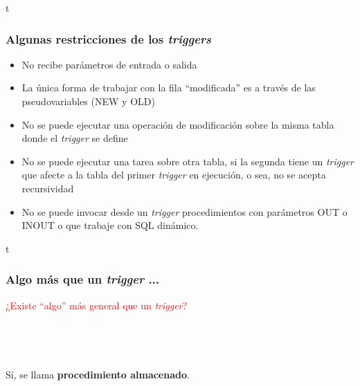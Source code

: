\documentclass[
	10pt, %
	aspectratio=169, %
]{beamer}
\begin{document}
\begin{frame}{t}
	
	\frametitle{Algunas restricciones de los \emph{triggers}}
	
	\begin{itemize}
		
		\item No recibe parámetros de entrada o salida
		
		\pause
		
		\item La única forma de trabajar con la fila ``modificada'' es a través de las pseudovariables (\textcolor{codepurple}{NEW} y \textcolor{codepurple}{OLD})
		
		\pause
		
		\item No se puede ejecutar una operación de modificación sobre la misma tabla donde el \emph{trigger} se define
		
		\pause
		
		\item No se puede ejecutar una tarea sobre otra tabla, si la segunda tiene un \emph{trigger} que afecte a la tabla del primer \emph{trigger} en ejecución, o sea, no se acepta recursividad
		
		\pause
		
		\item No se puede invocar desde un \emph{trigger} procedimientos con parámetros \textcolor{codepurple}{OUT} o \textcolor{codepurple}{INOUT} o que trabaje con SQL dinámico.
		
	\end{itemize}
	
\end{frame}


\begin{frame}{t}
	
	\frametitle{Algo más que un \emph{trigger} ...}
	
	\begin{centering}
		
		\textcolor{red}{¿Existe ``algo'' más general que un \emph{trigger}?}
				
		\ 
		
		\ 
		
		\pause
		
		Sí, se llama \textbf{procedimiento almacenado}.
		
	\end{centering}

	
\end{frame}
\end{document}
